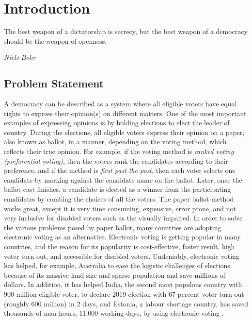 \chapter{Introduction}
\label{cha:intro}
\epigraph{The best weapon of a dictatorship is secrecy, but the best weapon of a democracy should be the weapon of openness.} 
{\textit{Niels Bohr}} 

\section{Problem Statement}
A democracy can be described as a system where all eligible voters have equal rights to express their opinion(s) on different matters. 
One of the most important examples of expressing opinions is by holding elections to elect the leader of country. During the 
elections, all eligible voters express their opinion on a paper, also known as ballot,	 in a manner, depending on the voting method, 
which reflects their true opinion. For example, if the voting method is \textit{ranked voting (preferential voting)}, then the voters rank the 
candidates according to their preference, and if the method is \textit{first past the post}, then each voter selects one candidate by marking
against the candidate name on the ballot. Later, once the ballot cast finishes, a candidate is elected as a winner from  the participating
candidates by combing the choices of all the voters. 
The paper ballot method works great, except it is very time consuming, expensive, error prone, 
and not very inclusive for disabled voters such as the visually impaired.
In order to solve the various problems posed by paper ballot, many countries are adopting electronic voting as an alternative. 
Electronic voting is 
getting popular in many countries, and the reason for its popularity is cost-effective, faster result, high voter turn out, 
and accessible for disabled voters.  
Undeniably, electronic voting has helped, for example, Australia to ease the logistic challenges of elections because of its massive land size and sparse
population and save millions of dollars.  In addition, it has helped India, the second most populous country with 900 million eligible voter, to declare 
2019 election with 67 percent voter turn out (roughly 600 million) in 2 days, and  Estonia, a labour shortage country, has saved 
thousands of man hours, 11,000 working days, by using electronic voting \citep{Estonia}.

